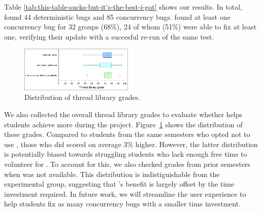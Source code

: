 Table \ref{tab:this-table-sucks-but-it's-the-best-i-got} shows our results.
In total, \landslide found 44 deterministic bugs and 85 concurrency bugs.
\landslide found at least one concurrency bug for 32 groups (68\%),
24 of whom (51\%) were able to fix at least one,
verifying their update with a succesful re-run of the same test.

\begin{figure}[t]
	\includegraphics[width=0.48\textwidth]{p2-distribution.pdf}
	\caption{Distribution of thread library grades.}
	\label{fig:p2-distribution}
\end{figure}
We also collected the overall thread library grades to evaluate whether \landslide helps students achieve more during the project.
Figure~\ref{fig:p2-distribution} shows the distribution of these grades.
Compared to students from the same semesters who opted not to use \landslide,
those who did scored on average 3\% higher. %
%
However, the latter distribution is potentially biased towards struggling students
who lack enough free time to volunteer for \landslide.
To account for this, we also checked grades from prior semesters when \landslide was not available.
This distribution is indistiguishable from the experimental group,
suggesting that \landslide's benefit is largely offset by the time investment required.
%
In future work, we will streamline the user experience to help students fix as many concurrency bugs with a smaller time investment.
